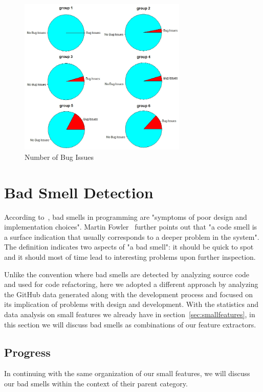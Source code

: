 \documentclass{acm_proc_article-sp}
\begin{document}
\begin{figure}[h]
\centering
\includegraphics[width=8cm]{img/bugratio}
\caption{Number of Bug Issues}
\label{fig:bugfix}
\end{figure}

\section{Bad Smell Detection}\label{sec:smelldetect}

According to~\cite{tufano2015and}, bad smells in programming are "symptoms of poor design and implementation choices".  Martin Fowler~\cite{Martin} further points out that "a code smell is a surface indication that usually corresponds to a deeper problem in the system". The definition indicates two aspects of "a bad smell": it should be quick to spot and it should most of time lead to interesting problems upon further inspection. 

Unlike the convention where bad smells are detected by analyzing source code and used for code refactoring, here we adopted a different approach by analyzing the GitHub data generated along with the development process and focused on its implication of problems with design and development. With the statistics and data analysis on small features we already have in section~\ref{sec:smallfeatures}, in this section we will discuss bad smells as combinations of our feature extractors.

\subsection{Progress}

In continuing with the same organization of our small features, we will discuss our bad smells within the context of their parent category.
\end{document}
